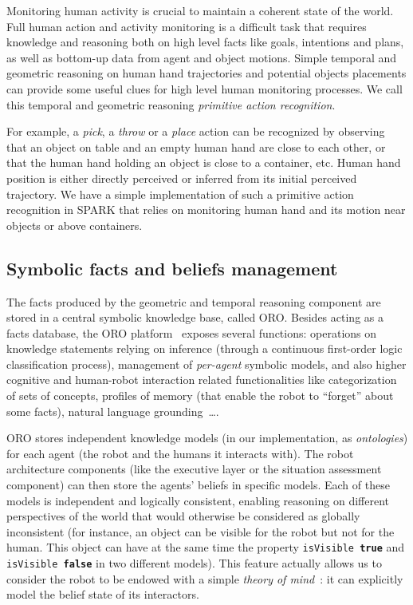 \documentclass{svmult}
\newcommand{\concept}[1]{{\footnotesize \texttt{#1}}}
\begin{document}
\vspace{0.3cm}
Monitoring human activity is crucial to maintain a coherent state of
the world. Full human action and activity monitoring is a difficult
task that requires knowledge and reasoning both on high level facts
like goals, intentions and plans, as well as bottom-up data from agent
and object motions. Simple temporal and geometric reasoning on human
hand trajectories and potential objects placements can provide some
useful clues for high level human monitoring processes. We call this
temporal and geometric reasoning \emph{primitive action recognition}.

For example, a \emph{pick}, a \emph{throw} or a \emph{place} action
can be recognized by observing that an object on table and an empty
human hand are close to each other, or that the human hand holding an
object is close to a container, etc. Human hand position is either
directly perceived or inferred from its initial perceived trajectory.
We have a simple implementation of such a primitive action recognition
in SPARK that relies on monitoring human hand and its motion near
objects or above containers.

\subsection{Symbolic facts and beliefs management}

The facts produced by the geometric and temporal reasoning component
are stored in a central symbolic knowledge base, called ORO. Besides
acting as a facts database, the ORO platform~\cite{Lemaignan2010}
exposes several functions: operations on knowledge statements relying
on inference (through a continuous first-order logic classification
process), management of \emph{per-agent} symbolic models, and also
higher cognitive and human-robot interaction related functionalities
like categorization of sets of concepts, profiles of memory (that
enable the robot to ``forget'' about some facts), natural language
grounding~\cite{Lemaignan2011}\ldots.

ORO stores independent knowledge models (in our implementation, as
\emph{ontologies}) for each agent (the robot and the humans it
interacts with). The robot architecture components (like the executive
layer or the situation assessment component) can then store the
agents' beliefs in specific models.  Each of these models is
independent and logically consistent, enabling reasoning on different
perspectives of the world that would otherwise be considered as
globally inconsistent (for instance, an object can be visible for the
robot but not for the human. This object can have at the same time the
property \concept{isVisible \textbf{true}} and \concept{isVisible
  \textbf{false}} in two different models). This feature actually
allows us to consider the robot to be endowed with a simple
\emph{theory of mind}~\cite{Scassellati2002}: it can explicitly
model the belief state of its interactors.
\end{document}
